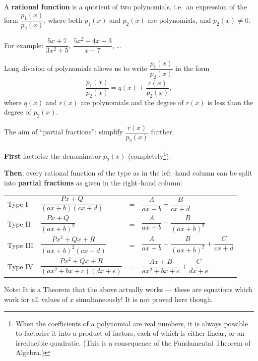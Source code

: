 \documentclass[
  12pt,
  oneside]{book}
\theoremstyle{definition}
\theoremstyle{definition}
\theoremstyle{definition}
\theoremstyle{definition}
\theoremstyle{remark}
\begin{document}
A \textbf{rational function} is a quotient of two polynomials, i.e.~an expression of the form \(\dfrac{p_1(x)}{p_2(x)}\), where both \(p_1(x)\) and \(p_2(x)\) are polynomials, and \(p_2(x)\neq0\).

For example: \(\dfrac{5x+7}{3x^2+5}\), \(\dfrac{5x^2-4x+3}{x-7}\), \ldots{}

Long division of polynomials allows us to write \(\dfrac{p_1(x)}{p_2(x)}\) in the form
\[
\frac{p_1(x)}{p_2(x)} = q(x) + \frac{r(x)}{p_2(x)},
\]
where \(q(x)\) and \(r(x)\) are polynomials and the degree of \(r(x)\) is less than
the degree of \(p_2(x)\).

The aim of ``partial fractions'': simplify \(\dfrac{r(x)}{p_2(x)}\) further.

\textbf{First} factorise the denominator \(p_2(x)\) (completely\footnote{When the coefficients of a polynomial are real numbers, it is always possible to factorise it into a product of factors, each of which is either linear, or an irreducible quadratic. (This is a consequence of the Fundamental Theorem of Algebra.)}).

\textbf{Then}, every rational function of the type as in the left--hand column can be split
into \textbf{partial fractions} as given in the right--hand column:

\begin{longtable}[]{@{}
  >{\raggedright\arraybackslash}p{}
  >{\raggedleft\arraybackslash}p{}
  >{\raggedright\arraybackslash}p{}
  >{\raggedright\arraybackslash}p{}@{}}
\toprule\noalign{}
\endhead
\bottomrule\noalign{}
\endlastfoot
Type I & \(\dfrac{Px+Q}{(ax+b)(cx+d)}\) & = & \(\dfrac{A}{ax+b}+\dfrac{B}{cx+d}\) \\
Type II & \(\dfrac{Px+Q}{(ax+b)^2}\) & = & \(\dfrac{A}{ax+b}+\dfrac{B}{(ax+b)^2}\) \\
Type III & \(\dfrac{Px^2+Qx+R}{(ax+b)^2(cx+d)}\) & = & \(\dfrac{A}{ax+b}+\dfrac{B}{(ax+b)^2}+\dfrac{C}{cx+d}\) \\
Type IV & \(\dfrac{Px^2+Qx+R}{(ax^2+bx+c)(dx+e)}\) & = & \(\dfrac{Ax+B}{ax^2+bx+c}+\dfrac{C}{dx+e}\) \\
\end{longtable}

Note: It is a Theorem that the above actually works --- these are equations which work for all values of \(x\) simultaneously! It is not proved here though.
\end{document}
